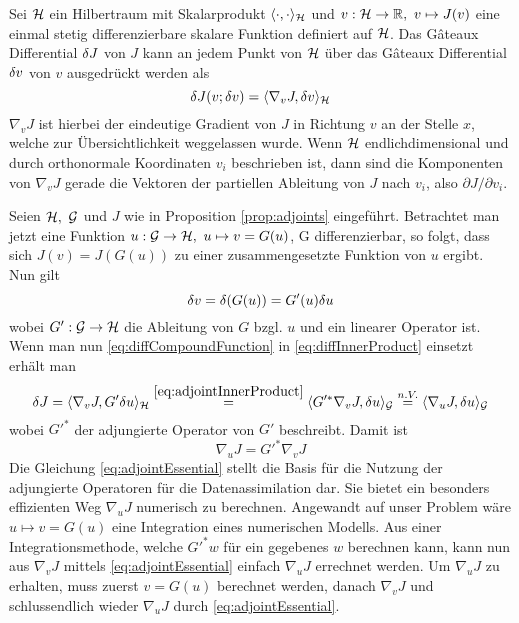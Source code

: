 \begin{proposition}
\label{prop:adjoints}
Sei $\mathcal{H}$ ein Hilbertraum mit Skalarprodukt $\langle \cdot,\cdot \rangle_{\mathcal{H}}$ und $v:\mathcal{H} \to \mathbb{R},~ v\mapsto J(v)$ eine einmal stetig differenzierbare skalare Funktion definiert auf $\mathcal{H}$. Das Gâteaux Differential $\delta J$ von $J$ kann an jedem Punkt von $\mathcal{H}$ über das Gâteaux Differential $\delta v$ von $v$ ausgedrückt werden als
 \begin{equation}
 \label{eq:diffInnerProduct}
  \delta J(v;\delta v) = \langle \nabla_v J, \delta v\rangle_{\mathcal{H}}
 \end{equation}
 $\nabla_v J$ ist hierbei der eindeutige Gradient von $J$ in Richtung $v$ an der Stelle $x$, welche zur Übersichtlichkeit weggelassen wurde. Wenn $\mathcal{H}$ endlichdimensional und durch orthonormale Koordinaten $v_i$ beschrieben ist, dann sind die Komponenten von $\nabla_v J$ gerade die Vektoren der partiellen Ableitung von $J$ nach $v_i$, also $\partial J/\partial v_i$.
\end{proposition}


Seien $\mathcal{H},~\mathcal{G}$ und $J$ wie in Proposition \ref{prop:adjoints} eingeführt. Betrachtet man jetzt eine Funktion $u:\mathcal{G} \to \mathcal{H}, ~u\mapsto v = G(u)$, G differenzierbar, so folgt, dass sich $J(v) = J(G(u))$ zu einer zusammengesetzte Funktion von $u$ ergibt. Nun gilt 
\begin{equation}
\label{eq:diffCompoundFunction}
\delta v = \delta(G(u)) = G'(u)\delta u
\end{equation}
wobei $G':\mathcal{G}\to\mathcal{H}$ die Ableitung von $G$ bzgl. $u$ und ein linearer Operator ist. Wenn man nun \eqref{eq:diffCompoundFunction} in \eqref{eq:diffInnerProduct} einsetzt erhält man 
\begin{equation}
 \delta J = \langle \nabla_v J,G'\delta u\rangle_{\mathcal{H}} \overset{\eqref{eq:adjointInnerProduct}}{=}  \langle G'^* \nabla_v J,\delta u\rangle_{\mathcal{G}} \overset{n.V.}{=} \langle \nabla_u J,\delta u\rangle_{\mathcal{G}} 
\end{equation}
wobei $G'^*$ der adjungierte Operator von $G'$ beschreibt. Damit ist 
\begin{equation}
\label{eq:adjointEssential}
\nabla_u J = G'^*\nabla_v J
\end{equation} 
Die Gleichung \eqref{eq:adjointEssential} stellt die Basis für die Nutzung der adjungierte Operatoren für die Datenassimilation dar. Sie bietet ein besonders effizienten Weg $\nabla_u J$ numerisch zu berechnen. Angewandt auf unser Problem wäre $u\mapsto v =G(u) $ eine Integration eines numerischen Modells. Aus einer Integrationsmethode, welche $G'^*w$ für ein gegebenes $w$ berechnen kann, kann nun aus $\nabla_v J$ mittels \eqref{eq:adjointEssential} einfach $\nabla_u J$ errechnet werden. 
Um $\nabla_u J$ zu erhalten, muss zuerst $v = G(u)$ berechnet werden, danach $\nabla_v J$ und schlussendlich wieder $\nabla_u J$ durch \eqref{eq:adjointEssential}.

